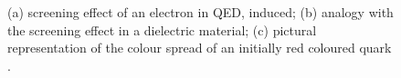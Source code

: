 \begin{figure}[t]
\begin{center}
\end{center}
\caption{(a) screening effect of an electron in QED, induced; (b) analogy with the screening effect in a dielectric material; (c) pictural representation of the colour spread of an initially red coloured quark \cite{deurQCDRunningCoupling2016}. }
\label{fig:ProbingTestCHarge}
\end{figure}

